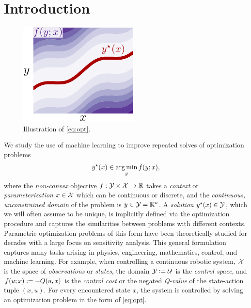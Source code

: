 \documentclass[twoside,11pt]{article}
\begin{document}
\section{Introduction}
\begin{figure}
\vspace{-4mm}
\includegraphics[width=\linewidth]{fig/opt.pdf}\vspace{-2mm}
\caption{Illustration of \cref{eq:opt}.}
\vspace{-12mm}
\end{figure}
We study the use of machine learning
to improve repeated solves of optimization problems
\begin{equation}
  y^\star(x) \in \operatorname*{arg\,min}_y f(y; x),
  \label{eq:opt}
\end{equation}
where the \emph{non-convex} objective
$f: {\mathcal{Y}}\times {\mathcal{X}}\rightarrow \mathbb{R}$
takes a \emph{context} or \emph{parameterization}
$x\in{\mathcal{X}}$ which can be continuous or discrete,
and the \emph{continuous, unconstrained domain} of
the problem is $y\in{\mathcal{Y}}=\mathbb{R}^n$.
A \emph{solution} $y^\star(x)\in{\mathcal{Y}}$, which we will often
assume to be unique, is implicitly defined via
the optimization procedure and captures the similarities
between problems with different contexts.
Parametric optimization problems of this form
have been theoretically studied for decades
\citep{bank1982non,fiacco1990sensitivity,shapiro2003sensitivity,klatte2006nonsmooth,bonnans2013perturbation,still2018lectures,fiacco2020mathematical}
with a large focus on sensitivity analysis.
This general formulation captures many
tasks arising in physics, engineering, mathematics, control,
and machine learning.
For example, when controlling a continuous robotic system,
${\mathcal{X}}$ is the space of \emph{observations} or \emph{states},
the domain ${\mathcal{Y}}\vcentcolon= {\mathcal{U}}$ is the \emph{control space},
and $f(u; x)\vcentcolon= -Q(u, x)$ is the \emph{control cost}
or the negated \emph{Q-value} of the state-action tuple $(x,u)$.
For every encountered state $x$, the system is controlled
by solving an optimization problem in the form of \cref{eq:opt}.
\end{document}

